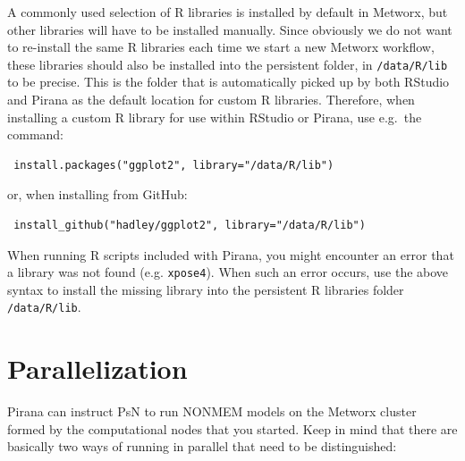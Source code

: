 \documentclass[a4,11pt]{report}
\begin{document}
A commonly used selection of R libraries is installed by default in
Metworx, but other libraries will have to be installed manually. Since
obviously we do not want to re-install the same R libraries each time we
start a new Metworx workflow, these libraries should also be installed
into the persistent folder, in \texttt{/data/R/lib} to be precise.
This is the folder that is automatically picked up by both RStudio and
Pirana as the default location for custom R libraries. Therefore, when
installing a custom R library for use within RStudio or Pirana, use
e.g.~the command:

\begin{verbatim}
 install.packages("ggplot2", library="/data/R/lib")
\end{verbatim}

or, when installing from GitHub:

\begin{verbatim}
 install_github("hadley/ggplot2", library="/data/R/lib")
\end{verbatim}

When running R scripts included with Pirana, you might encounter an
error that a library was not found (e.g. \texttt{xpose4}). When such an
error occurs, use the above syntax to install the missing library into
the persistent R libraries folder \texttt{/data/R/lib}.

\section*{Parallelization}\label{parallelization}

Pirana can instruct PsN to run NONMEM models on the Metworx cluster formed by the computational nodes that you started.
Keep in mind that there are basically two ways of running in parallel that need to be distinguished:
\end{document}

